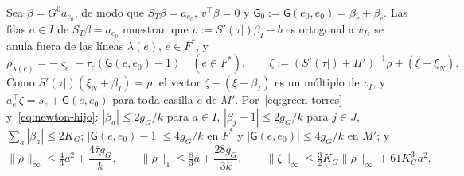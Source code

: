 Sea $\beta=G^0a_{e_0}$, de modo que $S_T\beta=a_{e_0}$, $v^\top\beta=0$ y $\mathsf G_0:=\mathsf
G(e_0,e_0)=\beta_r+\beta_c$. Las filas $a\in I$ de $S_T\beta=a_{e_0}$ muestran que
$\rho:=S'(\tau|)\beta_I-b$ es ortogonal a $v_I$, se anula fuera de las líneas $\lambda(e)$, $e\in F^*$,
y
\begin{equation}\label{eq:rho-hijo}
 \rho_{\lambda(e)}=-\varsigma_e-\tau_e(\mathsf G(e,e_0)-1)\quad(e\in F^*),\qquad
 \zeta:=(S'(\tau|)+\Pi')^{-1}\rho+(\xi-\xi_N).
\end{equation}
Como $S'(\tau|)(\xi_N+\beta_I)=\rho$, el vector $\zeta-(\xi+\beta_I)$ es un múltiplo de $v_I$, y
$a_e^\top\zeta=s_e+\mathsf G(e,e_0)$ para toda casilla $e$ de $M'$. Por~\eqref{eq:green-torres}
y~\eqref{eq:newton-hijo}: $|\beta_a|\le2g_G/k$ para $a\in I$, $|\beta_j-1|\le2g_G/k$ para $j\in J$,
$\sum_a|\beta_a|\le2K_G$; $|\mathsf G(e,e_0)-1|\le4g_G/k$ en $F^*$ y $|\mathsf G(e,e_0)|\le4g_G/k$ en
$M'$; y
\begin{equation}\label{eq:cotas-hijo}
 \|\rho\|_\infty\le\tfrac43a^2+\frac{4\bar\tau g_G}k,\qquad
 \|\rho\|_1\le\tfrac83a+\frac{28g_G}{3k},\qquad
 \|\zeta\|_\infty\le\tfrac32K_G\|\rho\|_\infty+61K_G^3a^2 .
\end{equation}


